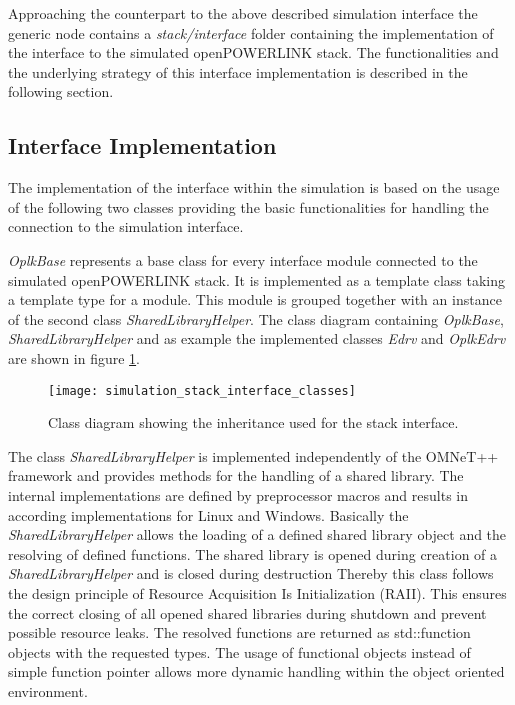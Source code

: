 Approaching the counterpart to the above described simulation interface the generic node contains a \emph{stack/interface} folder containing the implementation of the interface to the simulated openPOWERLINK stack.
The functionalities and the underlying strategy of this interface implementation is described in the following section.

\subsection{Interface Implementation}
\label{sec:porting_stack_interface}
The implementation of the interface within the simulation is based on the usage of the following two classes providing the basic functionalities for handling the connection to the simulation interface.

\emph{OplkBase} represents a base class for every interface module connected to the simulated openPOWERLINK stack.
It is implemented as a template class taking a template type for a module.
This module is grouped together with an instance of the second class \emph{SharedLibraryHelper}.
The class diagram containing \emph{OplkBase}, \emph{SharedLibraryHelper} and as example the implemented classes \emph{Edrv} and \emph{OplkEdrv} are shown in figure \ref{fig:simulation_stack_interface_classes}.

\begin{figure}
    \centering
    \texttt{[image: simulation\_stack\_interface\_classes]}
    \caption{Class diagram showing the inheritance used for the stack interface.}
    \label{fig:simulation_stack_interface_classes}
\end{figure}

\begin{sloppypar}
The class \emph{SharedLibraryHelper} is implemented independently of the OMNeT++ framework and provides methods for the handling of a shared library.
The internal implementations are defined by preprocessor macros and results in according implementations for Linux and Windows.
Basically the \emph{SharedLibraryHelper} allows the loading of a defined shared library object and the resolving of defined functions.
The shared library is opened during creation of a \emph{SharedLibraryHelper} and is closed during destruction
Thereby this class follows the design principle of Resource Acquisition Is Initialization (RAII).
This ensures the correct closing of all opened shared libraries during shutdown and prevent possible resource leaks.
The resolved functions are returned as std::function objects with the requested types.
The usage of functional objects instead of simple function pointer allows more dynamic handling within the object oriented environment.
\end{sloppypar}

